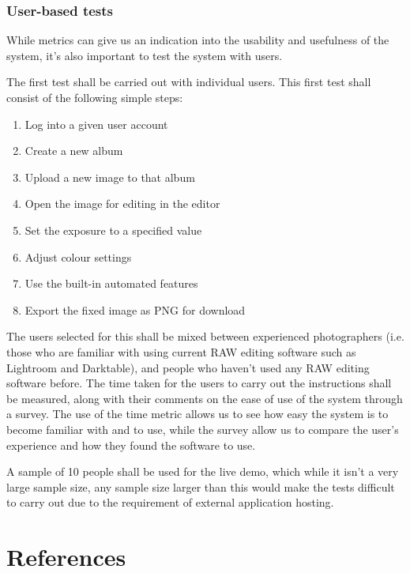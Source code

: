 \documentclass[12pt,a4paper]{article}
\begin{document}
\subsubsection{User-based tests}
While metrics can give us an indication into the usability and usefulness of the system,
it's also important to test the system with users.

The first test shall be carried out with individual users. This first test shall consist of
the following simple steps:

\begin{enumerate}
  \item Log into a given user account
  \item Create a new album
  \item Upload a new image to that album
  \item Open the image for editing in the editor
  \item Set the exposure to a specified value
  \item Adjust colour settings
  \item Use the built-in automated features
  \item Export the fixed image as PNG for download
\end{enumerate}

The users selected for this shall be mixed between experienced photographers (i.e. those
who are familiar with using current RAW editing software such as Lightroom and Darktable), and
people who haven't used any RAW editing software before. The time taken for the users to carry
out the instructions shall be measured, along with their comments on the ease of use of the system through a survey.
The use of the time metric allows us to see how easy the system is to become familiar with and to use, while the survey
allow us to compare the user's experience and how they found the software to use.

A sample of 10 people shall be used for the live demo, which while it isn't a very large sample size,
any sample size larger than this would make the tests difficult to carry out due to the requirement of external
application hosting.

\section{References}
\end{document}
